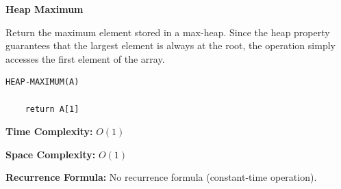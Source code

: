 \documentclass[a4paper,12pt]{article}
\begin{document}
\begin{tcolorbox}[
    colback=gray!30,
    colframe=black,
    boxrule=1pt,
    arc=0mm
]

\begin{tcolorbox}[
    colback=gray!10,
    colframe=black,
    arc=0mm
]
\centering
{\Huge\bfseries Heap Maximum}
\end{tcolorbox}


\begin{tcolorbox}[
    colback=gray!10,
    colframe=black,
    arc=0mm
]
\small
Return the maximum element stored in a max-heap.
Since the heap property guarantees that the largest element is always at the root,
the operation simply accesses the first element of the array.
\end{tcolorbox}


\begin{tcolorbox}[
    colback=black!5,
    colframe=black,
    arc=0mm,
    title=Pseudo-code
]
\tiny
\begin{lstlisting}
HEAP-MAXIMUM(A)

    return A[1]
\end{lstlisting}
\end{tcolorbox}


\begin{tcolorbox}[
    colback=cyan!20,
    colframe=black,
    arc=0mm
]
\small
\textbf{Time Complexity:}
$O(1)$
\end{tcolorbox}


\begin{tcolorbox}[
    colback=violet!20,
    colframe=black,
    arc=0mm
]
\small
\textbf{Space Complexity:}
$O(1)$
\end{tcolorbox}


\begin{tcolorbox}[
    colback=pink!20,
    colframe=black,
    arc=0mm
]
\small
\textbf{Recurrence Formula:}
No recurrence formula (constant-time operation).
\end{tcolorbox}

\end{tcolorbox}
\end{document}
